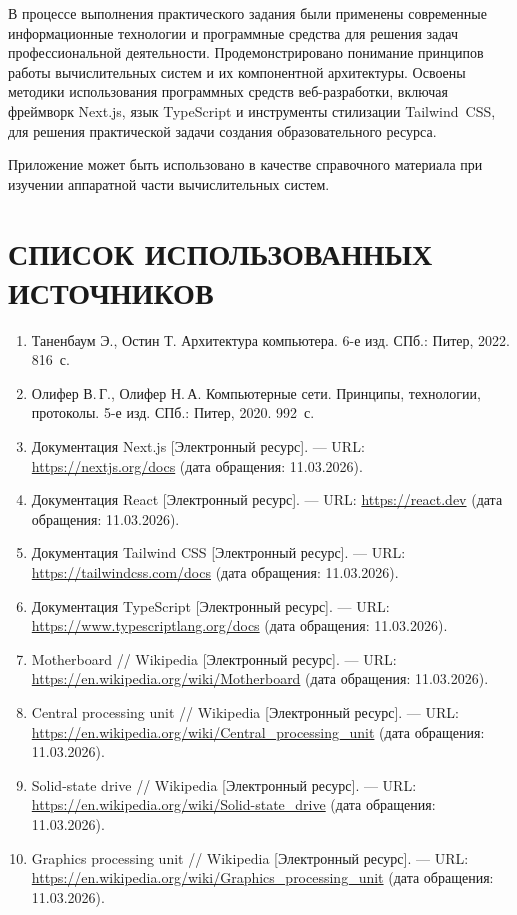 \documentclass[14pt,a4paper]{extarticle}
\begin{document}
В процессе выполнения практического задания были применены современные информационные технологии и программные средства для решения задач профессиональной деятельности. Продемонстрировано понимание принципов работы вычислительных систем и их компонентной архитектуры. Освоены методики использования программных средств веб-разработки, включая фреймворк Next.js, язык TypeScript и инструменты стилизации Tailwind~CSS, для решения практической задачи создания образовательного ресурса.

Приложение может быть использовано в качестве справочного материала при изучении аппаратной части вычислительных систем.

\newpage
\section*{СПИСОК ИСПОЛЬЗОВАННЫХ ИСТОЧНИКОВ}

\begin{enumerate}
  \item Таненбаум Э., Остин Т. Архитектура компьютера. 6-е изд. СПб.: Питер, 2022. 816~с.
  \item Олифер В.\,Г., Олифер Н.\,А. Компьютерные сети. Принципы, технологии, протоколы. 5-е изд. СПб.: Питер, 2020. 992~с.
  \item Документация Next.js [Электронный ресурс]. --- URL: \url{https://nextjs.org/docs} (дата обращения: 11.03.2026).
  \item Документация React [Электронный ресурс]. --- URL: \url{https://react.dev} (дата обращения: 11.03.2026).
  \item Документация Tailwind CSS [Электронный ресурс]. --- URL: \url{https://tailwindcss.com/docs} (дата обращения: 11.03.2026).
  \item Документация TypeScript [Электронный ресурс]. --- URL: \url{https://www.typescriptlang.org/docs} (дата обращения: 11.03.2026).
  \item Motherboard // Wikipedia [Электронный ресурс]. --- URL: \url{https://en.wikipedia.org/wiki/Motherboard} (дата обращения: 11.03.2026).
  \item Central processing unit // Wikipedia [Электронный ресурс]. --- URL: \url{https://en.wikipedia.org/wiki/Central_processing_unit} (дата обращения: 11.03.2026).
  \item Solid-state drive // Wikipedia [Электронный ресурс]. --- URL: \url{https://en.wikipedia.org/wiki/Solid-state_drive} (дата обращения: 11.03.2026).
  \item Graphics processing unit // Wikipedia [Электронный ресурс]. --- URL: \url{https://en.wikipedia.org/wiki/Graphics_processing_unit} (дата обращения: 11.03.2026).
\end{enumerate}
\end{document}
